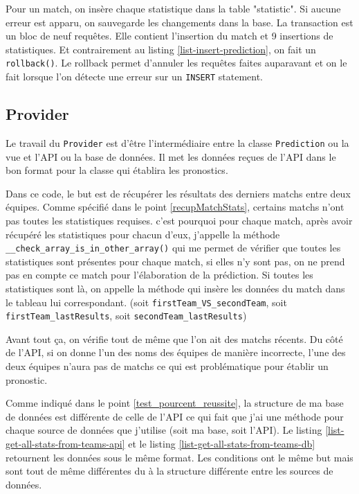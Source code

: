 \documentclass[a4paper,14pt]{extarticle}
\begin{document}
{

Pour un match, on insère chaque statistique dans la table "statistic". Si aucune erreur est apparu, on sauvegarde les changements dans la base. La transaction est un bloc de neuf requêtes. Elle contient l'insertion du match et 9 insertions de statistiques. Et contrairement au listing \ref{list-insert-prediction}, on fait un \texttt{rollback()}. Le rollback permet d'annuler les requêtes faites auparavant et on le fait lorsque l'on détecte une erreur sur un \texttt{INSERT} statement.

\subsection{Provider}

Le travail du \texttt{Provider} est d'être l'intermédiaire entre la classe \texttt{Prediction} ou la vue et l'API ou la base de données. Il met les données reçues de l'API dans le bon format pour la classe qui établira les pronostics. 


Dans ce code, le but est de récupérer les résultats des derniers matchs entre deux équipes. Comme spécifié dans le point \ref{recupMatchStats}, certains matchs n'ont pas toutes les statistiques requises. c'est pourquoi pour chaque match, après avoir récupéré les statistiques pour chacun d'eux, j'appelle la méthode \texttt{\_\_check\_array\_is\_in\_other\_array()} qui me permet de vérifier que toutes les statistiques sont présentes pour chaque match, si elles n'y sont pas, on ne prend pas en compte ce match pour l'élaboration de la prédiction. Si toutes les statistiques sont là, on appelle la méthode qui insère les données du match dans le tableau lui correspondant. (soit \texttt{firstTeam\_VS\_secondTeam}, soit \texttt{firstTeam\_lastResults}, soit \texttt{secondTeam\_lastResults})

Avant tout ça, on vérifie tout de même que l'on ait des matchs récents. Du côté de l'API, si on donne l'un des noms des équipes de manière incorrecte, l'une des deux équipes n'aura pas de matchs ce qui est problématique pour établir un pronostic. 

\newpage


Comme indiqué dans le point \ref{test_pourcent_reussite}, la structure de ma base de données est différente de celle de l'API ce qui fait que j'ai une méthode pour chaque source de données que j'utilise (soit ma base, soit l'API). Le listing \ref{list-get-all-stats-from-teams-api} et le listing \ref{list-get-all-stats-from-teams-db} retournent les données sous le même format. Les conditions ont le même but mais sont tout de même différentes du à la structure différente entre les sources de données. 

}
\end{document}
